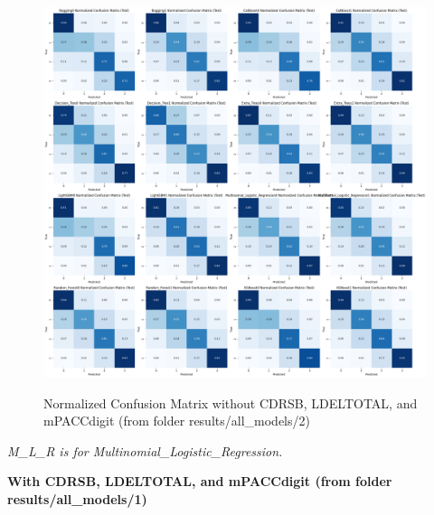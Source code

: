 \newpage

\begin{figure}[H]
	\centering
	\includegraphics[width=1\textwidth]{images/2_Confusion_Matrix_Normalized.png}
	\label{fig:Normalized Confusion Matrix without CDRSB, LDELTOTAL, and mPACCdigit}
	\caption{Normalized Confusion Matrix without CDRSB, LDELTOTAL, and mPACCdigit (from folder results/all\_models/2)}
\end{figure}

\newpage

\textit{M\_L\_R is for Multinomial\_Logistic\_Regression.}

\vspace{4mm}

\textbf{With CDRSB, LDELTOTAL, and mPACCdigit (from folder results/all\_models/1)}


